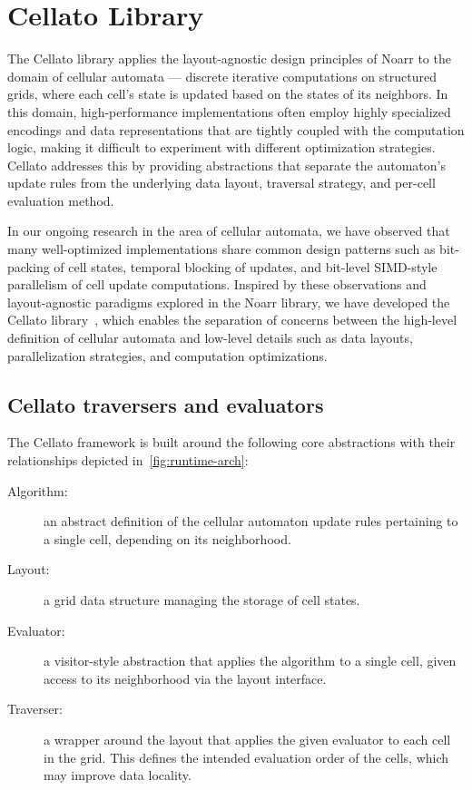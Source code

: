 \section{Cellato Library}\label{chap:cellato}


The Cellato library applies the layout-agnostic design principles of Noarr to the domain of cellular automata --- discrete iterative computations on structured grids, where each cell's state is updated based on the states of its neighbors. In this domain, high-performance implementations often employ highly specialized encodings and data representations that are tightly coupled with the computation logic, making it difficult to experiment with different optimization strategies. Cellato addresses this by providing abstractions that separate the automaton's update rules from the underlying data layout, traversal strategy, and per-cell evaluation method.

In our ongoing research in the area of cellular automata, we have observed that many well-optimized implementations share common design patterns such as bit-packing of cell states, temporal blocking of updates, and bit-level SIMD-style parallelism of cell update computations. Inspired by these observations and layout-agnostic paradigms explored in the Noarr library, we have developed the Cellato library~\cite{brabec2025cellato}, which enables the separation of concerns between the high-level definition of cellular automata and low-level details such as data layouts, parallelization strategies, and computation optimizations.


\subsection{Cellato traversers and evaluators}\label{sec:cellato-evaluators}

The Cellato framework is built around the following core abstractions with their relationships depicted in~\cref{fig:runtime-arch}:
\begin{description}
  \item[Algorithm:]\label{des:algorithm} an abstract definition of the cellular automaton update rules pertaining to a single cell, depending on its neighborhood.
  \item[Layout:]\label{des:layout} a grid data structure managing the storage of cell states.
  \item[Evaluator:]\label{des:evaluator} a visitor-style abstraction that applies the algorithm to a single cell, given access to its neighborhood via the layout interface.
  \item[Traverser:]\label{des:traverser} a wrapper around the layout that applies the given evaluator to each cell in the grid. This defines the intended evaluation order of the cells, which may improve data locality.
\end{description}

